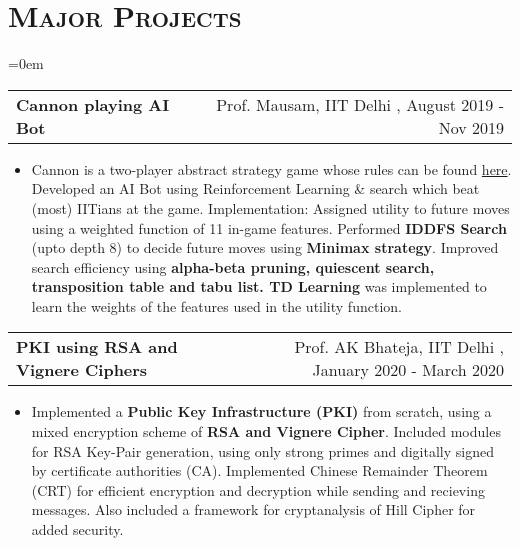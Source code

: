 \documentclass{article}
\makeatletter
\newenvironment{longversion}{}{} %
\newenvironment{absolutelynopagebreak}
  {\par\nobreak\vfil\penalty0\vfilneg
   \vtop\bgroup}
  {\par\xdef\tpd{\the\prevdepth}\egroup
   \prevdepth=\tpd}
\newcommand{\headerrow}[2]
{\begin{tabular*}{\linewidth}{l@{\extracolsep{\fill}}r}
	#1 &
	#2 \\
\end{tabular*}}
\newcommand{\tmpsection}[1]{}
\let\tmpsection=\section
\renewcommand{\section}[1]{\tmpsection*{\textsc{#1}}}
\makeatother
\begin{document}
\begin{longversion}
\section{Major Projects}
\begin{list} {}{\leftmargin=0em}
\setlength{\leftmargin}{0pt}

 \item[]
 \headerrow { \textbf{Cannon playing AI Bot}} {Prof. Mausam, IIT Delhi , August 2019 - Nov 2019}
 \begin{itemize} \item[]
Cannon is a two-player abstract strategy game whose rules can be found \href{https://nestorgames.com/rulebooks/CANNON_EN.pdf}{here}. Developed an AI Bot using Reinforcement Learning \& search which beat (most) IITians at the game. Implementation: Assigned utility to future moves using a weighted function of 11 in-game features. Performed \textbf{IDDFS Search} (upto depth 8) to decide future moves using \textbf{Minimax strategy}. Improved search efficiency using \textbf{alpha-beta pruning, quiescent search, transposition table and tabu list. TD Learning} was implemented to learn the weights of the features used in the utility function.
 \end{itemize}
 
  \headerrow { \textbf{PKI using RSA and Vignere Ciphers}} {Prof. AK Bhateja, IIT Delhi , January 2020 - March 2020}
 \begin{itemize} \item[]
Implemented a \textbf{Public Key Infrastructure (PKI)} from scratch, using a mixed encryption scheme of \textbf{RSA and Vignere Cipher}. Included modules for RSA Key-Pair generation, using only strong primes and digitally signed by certificate authorities (CA). Implemented Chinese Remainder Theorem (CRT) for efficient encryption and decryption while sending and recieving messages. Also included a framework for cryptanalysis of Hill Cipher for added security.
 \end{itemize}
 

\end{list}
\end{longversion}
\end{document}
